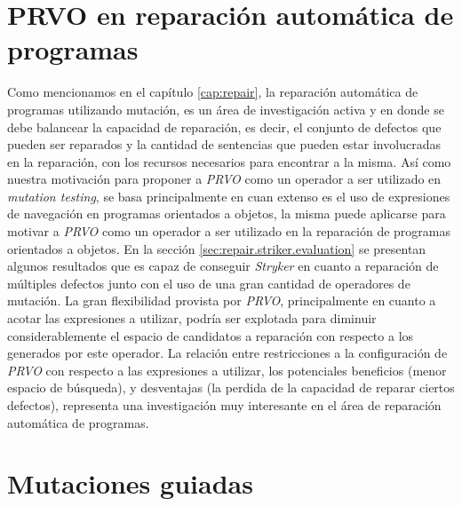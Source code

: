 \section{PRVO en reparaci\'on autom\'atica de programas}

Como mencionamos en el cap\'itulo \ref{cap:repair}, la reparaci\'on autom\'atica de programas utilizando mutaci\'on, es un \'area de investigaci\'on activa y en donde se debe balancear la capacidad de reparaci\'on, es decir, el conjunto de defectos que pueden ser reparados y la cantidad de sentencias que pueden estar involucradas en la reparaci\'on, con los recursos necesarios para encontrar a la misma. As\'i como nuestra motivaci\'on para proponer a \emph{PRVO} como un operador a ser utilizado en \emph{mutation testing}, se basa principalmente en cuan extenso es el uso de expresiones de navegaci\'on en programas orientados a objetos, la misma puede aplicarse para motivar a \emph{PRVO} como un operador a ser utilizado en la reparaci\'on de programas orientados a objetos. En la secci\'on \ref{sec:repair.striker.evaluation} se presentan algunos resultados que es capaz de conseguir \emph{Stryker} en cuanto a reparaci\'on de m\'ultiples defectos junto con el uso de una gran cantidad de operadores de mutaci\'on. La gran flexibilidad provista por \emph{PRVO}, principalmente en cuanto a acotar las expresiones a utilizar, podr\'ia ser explotada para diminuir considerablemente el espacio de candidatos a reparaci\'on con respecto a los generados por este operador. La relaci\'on entre restricciones a la configuraci\'on de \emph{PRVO} con respecto a las expresiones a utilizar, los potenciales beneficios (menor espacio de b\'usqueda), y desventajas (la perdida de la capacidad de reparar ciertos defectos), representa una investigaci\'on muy interesante en el \'area de reparaci\'on autom\'atica de programas.

\pagebreak
\section{Mutaciones guiadas}

